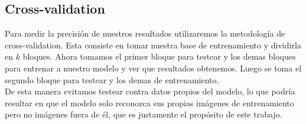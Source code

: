 \subsection{Cross-validation}
Para medir la precisión de nuestros resultados utilizaremos la metodología de cross-validation. Esta consiste en tomar nuestra base de entrenamiento y dividirla en $k$ bloques. Ahora tomamos el primer bloque para testear y los demas bloques para entrenar a nuestro modelo y ver que resultados obtenemos. Luego se toma el segundo bloque para testear y los demas de entrenamiento.
\\
De esta manera evitamos testear contra datos propios del modelo, lo que podría resultar en que el modelo solo reconozca sus propias imágenes de entrenamiento pero no imágenes fuera de él, que es justamente el propósito de este trabajo.
